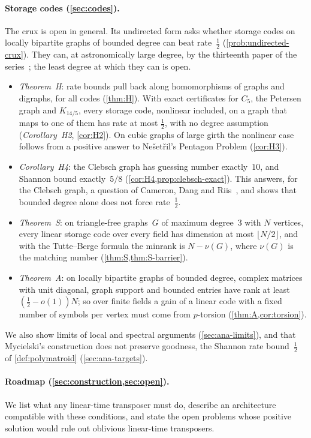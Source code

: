 \paragraph{Storage codes (\cref{sec:codes}).} The crux is open in general. Its undirected form asks whether storage codes on
locally bipartite graphs of bounded degree can beat rate~$\tfrac12$ (\cref{prob:undirected-crux}). They can, at
astronomically large degree, by the thirteenth paper of the series~\cite[Corollary~U]{StorageCodes2026}; the least
degree at which they can is open.
\begin{itemize}[leftmargin=2em]
\item \emph{Theorem~H}: rate bounds pull back along homomorphisms of graphs and digraphs, for all codes
(\cref{thm:H}). With exact certificates for $C_5$, the Petersen graph and $K_{14/5}$, every storage code, nonlinear
included, on a graph that maps to one of them has rate at most $\tfrac12$, with no degree assumption
(\emph{Corollary~H2}, \cref{cor:H2}). On cubic graphs of large girth the nonlinear case follows from a positive answer to Nešetřil's
Pentagon Problem (\cref{cor:H3}).
\item \emph{Corollary~H4}: the Clebsch graph has guessing number exactly~$10$, and Shannon bound exactly~$5/8$
(\cref{cor:H4,prop:clebsch-exact}). This answers, for the Clebsch graph, a question of Cameron, Dang and Riis~\cite{CameronDangRiis2014}, and
shows that bounded degree alone does not force rate~$\tfrac12$.
\item \emph{Theorem~S}: on triangle-free graphs~$G$ of maximum degree~$3$ with $N$ vertices, every linear storage code over
every field has dimension at most $\lfloor N/2\rfloor$, and with the Tutte--Berge formula the minrank is $N-\nu(G)$, where
$\nu(G)$ is the matching number (\cref{thm:S,thm:S-barrier}).
\item \emph{Theorem~A}: on locally bipartite graphs of bounded degree, complex matrices with unit diagonal, graph support
and bounded entries have rank at least $(\tfrac12-o(1))N$; so over finite fields a gain of a linear code with a fixed
number of symbols per vertex must come from $p$-torsion (\cref{thm:A,cor:torsion}).
\end{itemize}
We also show limits of local and spectral arguments (\cref{sec:ana-limits}), and that Mycielski's construction does
not preserve goodness, the Shannon rate bound~$\tfrac12$ of \cref{def:polymatroid} (\cref{sec:ana-targets}).

\paragraph{Roadmap (\cref{sec:construction,sec:open}).} We list what any linear-time transposer must do, describe an
architecture compatible with these conditions, and state the open problems whose positive solution would rule out
oblivious linear-time transposers.

